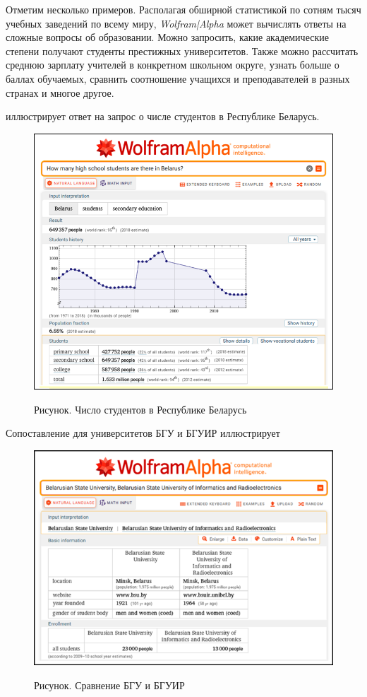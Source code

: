 Отметим несколько примеров. Располагая обширной статистикой по сотням тысяч учебных заведений по всему миру, \textit{Wolfram|Alpha} может вычислять ответы на сложные вопросы об образовании.
Можно запросить, какие академические степени получают студенты престижных университетов. 
Также можно рассчитать среднюю зарплату учителей в конкретном школьном округе, узнать больше о баллах обучаемых, сравнить соотношение учащихся и преподавателей в разных странах и многое другое.

\textit{} иллюстрирует ответ на запрос о числе студентов в Республике Беларусь. 
\begin{figure}[H]
	\caption{Рисунок. Число студентов в Республике Беларусь}
	\includegraphics[scale=0.7]{images/part7/chapter_integration/integr_alg2.png}
	\label{fig:integr_alg2}
\end{figure}

Сопоставление для университетов БГУ и БГУИР иллюстрирует  \textit{}
\begin{figure}[H]
	\caption{Рисунок. Сравнение БГУ и БГУИР}
	\includegraphics[scale=0.86]{images/part7/chapter_integration/integr_alg3.png}
	\label{fig:integr_alg3}
\end{figure}

